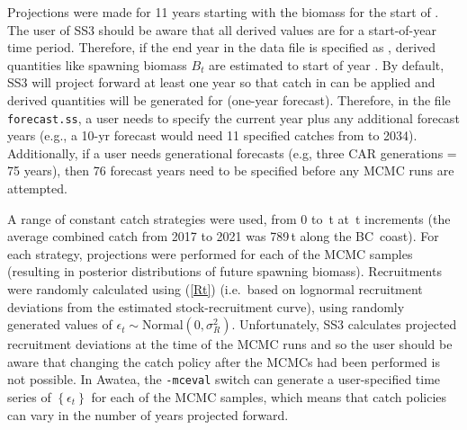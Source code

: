 \documentclass[11pt]{book}
\newcommand{\code}[1]{\normalsize\texttt{#1}\normalsize}%
\newcommand{\eref}[1]{(\ref{#1})}
\begin{document}
Projections were made for 11 years starting with the biomass for the start of \currYear.
The user of SS3 should be aware that all derived values are for a start-of-year time period.
Therefore, if the end year in the data file is specified as \prevYear, derived quantities like spawning biomass $B_t$ are estimated to start of year \prevYear.
By default, SS3 will project forward at least one year so that catch in \prevYear{} can be applied and derived quantities will be generated for \currYear{} (one-year forecast).
Therefore, in the file \code{forecast.ss}, a user needs to specify the current year plus any additional forecast years (e.g., a 10-yr forecast would need 11 specified catches from \currYear{} to 2034).
Additionally, if a user needs generational forecasts (e.g, three CAR generations = 75 years), then 76 forecast years need to be specified before any MCMC runs are attempted.

A range of constant catch strategies were used, from 0 to \policyMax\,t at \policyInc\,t increments (the average combined catch from 2017 to 2021 was 789\,t along the BC~coast).
For each strategy, projections were performed for each of the \Nbase{} MCMC samples (resulting in posterior distributions of future spawning biomass).
Recruitments were randomly calculated using \eref{Rt} (i.e.~based on lognormal recruitment deviations from the estimated stock-recruitment curve), using randomly generated values of $\epsilon_t \sim \mbox{Normal}(0, \sigma_R^2)$. 
Unfortunately, SS3 calculates projected recruitment deviations at the time of the MCMC runs and so the user should be aware that changing the catch policy after the MCMCs had been performed is not possible. 
In Awatea, the \code{-mceval} switch can generate a user-specified time series of $\left\{ \epsilon_t \right\}$ for each of the MCMC samples, which means that catch policies can vary in the number of years projected forward.



\renewcommand\bibsection{\section{REFERENCES -- MODEL EQUATIONS}}

\end{document}
